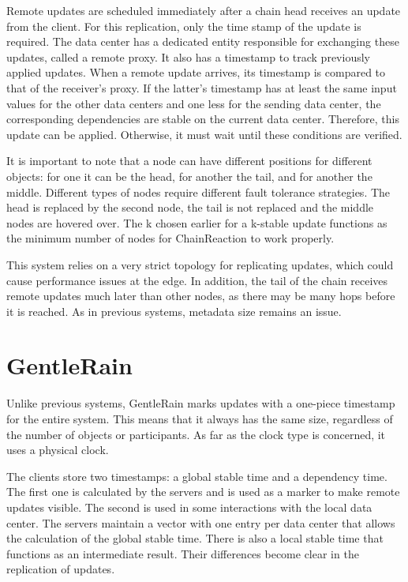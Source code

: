 Remote updates are scheduled immediately after a chain head receives an update from the client. For this replication, only the time stamp of the update is required. The data center has a dedicated entity responsible for exchanging these updates, called a remote proxy. It also has a timestamp to track previously applied updates. 
When a remote update arrives, its timestamp is compared to that of the receiver's proxy. If the latter's timestamp has at least the same input values for the other data centers and one less for the sending data center, the corresponding dependencies are stable on the current data center. Therefore, this update can be applied. Otherwise, it must wait until these conditions are verified. 

It is important to note that a node can have different positions for different objects: for one it can be the head, for another the tail, and for another the middle. Different types of nodes require different fault tolerance strategies. The head is replaced by the second node, the tail is not replaced and the middle nodes are hovered over. The k chosen earlier for a k-stable update functions as the minimum number of nodes for ChainReaction to work properly. 

This system relies on a very strict topology for replicating updates, which could cause performance issues at the edge. In addition, the tail of the chain receives remote updates much later than other nodes, as there may be many hops before it is reached. As in previous systems, metadata size remains an issue.

\section{GentleRain}
\label{sec:soa:gentlerain}

Unlike previous systems, GentleRain \cite{du2014gentlerain} marks updates with a one-piece timestamp for the entire system. This means that it always has the same size, regardless of the number of objects or participants. As far as the clock type is concerned, it uses a physical clock. 

The clients store two timestamps: a global stable time and a dependency time. The first one is calculated by the servers and is used as a marker to make remote updates visible. The second is used in some interactions with the local data center. The servers maintain a vector with one entry per data center that allows the calculation of the global stable time. There is also a local stable time that functions as an intermediate result. Their differences become clear in the replication of updates. 

